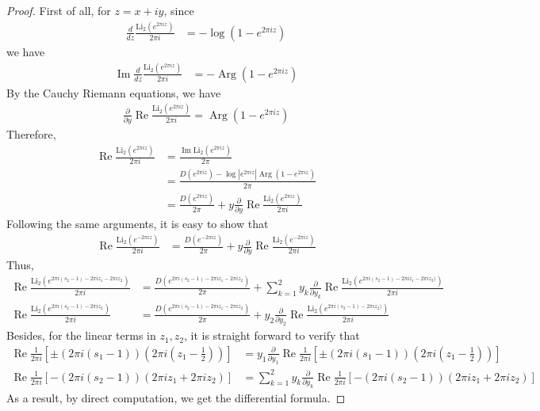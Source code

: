 \documentclass[10pt,a4paper]{article}
\newcommand{\lt}{\left}
\newcommand{\rt}{\right}
\def \Re{\operatorname{Re}}
\def \Re{\operatorname{Re}}
\def \im{\operatorname{Im}}
\def \Li{\operatorname{Li_2}}
\def \im{\operatorname{Im}}
\def \Arg{\operatorname{Arg}}
\begin{document}
\begin{proof}
First of all, for $z = x + i y$, since
\begin{align*}
\frac{d}{dz} \frac{\Li (e^{2\pi i z})}{2\pi i} &= -\log(1-e^{2\pi i z}) 
\end{align*}
we have
\begin{align*}
\im \frac{d}{dz} \frac{\Li (e^{2\pi i z})}{2\pi i} &= - \Arg(1-e^{2\pi i z})
\end{align*}
By the Cauchy Riemann equations, we have
\begin{align*}
 \frac{\partial}{\partial y} \Re \frac{\Li (e^{2\pi i z})}{2\pi i} =  \Arg(1-e^{2\pi i z})
\end{align*}
Therefore, 
\begin{align*}
\Re \frac{\Li(e^{2\pi i z})}{2\pi i} 
&= \frac{\im \Li(e^{2\pi i z})}{2\pi} \\
&= \frac{D(e^{2\pi i z}) - \log |e^{2\pi i z}| \Arg(1-e^{2\pi i z})}{2\pi}\\
&= \frac{D(e^{2\pi i z})}{2\pi} + y\frac{\partial}{\partial y} \Re \frac{\Li(e^{2\pi i z})}{2\pi i} 
\end{align*}
Following the same arguments, it is easy to show that
\begin{align*}
\Re \frac{\Li(e^{-2\pi i z})}{2\pi i} &= \frac{D(e^{-2\pi i z})}{2\pi} + y\frac{\partial}{\partial y} \Re \frac{\Li(e^{-2\pi i z})}{2\pi i} 
\end{align*}
Thus,
\begin{align*}
\Re \frac{\Li(e^{2\pi i(s_2 - 1) - 2\pi i z_1 - 2\pi i z_2})}{2\pi i} &= \frac{D(e^{2\pi i(s_2 - 1) - 2\pi i z_1 - 2\pi i z_2})}{2\pi} + \sum_{k=1}^2 y_k\frac{\partial}{\partial y_k} \Re \frac{\Li(e^{2\pi i(s_2 - 1) - 2\pi i z_1 - 2\pi i z_2)})}{2\pi i} \\
\Re \frac{\Li(e^{2\pi i(s_2 - 1) - 2\pi i z_2})}{2\pi i} &= \frac{D(e^{2\pi i(s_2 - 1) - 2\pi i z_1 - 2\pi i z_2})}{2\pi} +  y_2\frac{\partial}{\partial y_2} \Re \frac{\Li(e^{2\pi i(s_2 - 1)  - 2\pi i z_2)})}{2\pi i} 
\end{align*}
Besides, for the linear terms in $z_1,z_2$, it is straight forward to verify that 
\begin{align*}
\Re\frac{1}{2\pi i} \lt[ \pm \lt(2\pi i \lt( s_1 - 1\rt)\rt) \lt(2\pi i \lt(z_1 -\frac{1}{2} \rt)\rt) \rt]&= y_1 \frac{\partial}{\partial y_1}\Re\frac{1}{2\pi i} \lt[ \pm \lt(2\pi i \lt( s_1 - 1\rt)\rt) \lt(2\pi i \lt(z_1 -\frac{1}{2} \rt)\rt) \rt]\\
\Re\frac{1}{2\pi i}  \lt[ - (2\pi i (s_2-1))(2\pi i z_1 + 2\pi i z_2) \rt]&= \sum_{k=1}^2 y_k \frac{\partial}{\partial y_k} \Re\frac{1}{2\pi i}  \lt[ - (2\pi i (s_2-1))(2\pi i z_1 + 2\pi i z_2) \rt]
\end{align*}
As a result, by direct computation, we get the differential formula.
\end{proof}
\end{document}
